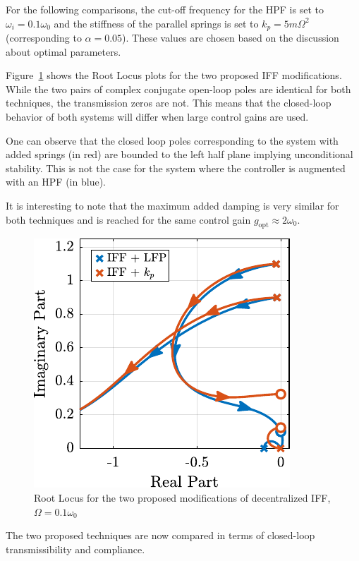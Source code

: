 \documentclass[10pt]{iopart}
\begin{document}
For the following comparisons, the cut-off frequency for the HPF is set to \(\omega_i = 0.1 \omega_0\) and the stiffness of the parallel springs is set to \(k_p = 5 m \Omega^2\) (corresponding to \(\alpha = 0.05\)).
These values are chosen based on the discussion about optimal parameters.

\par
Figure~\ref{fig:comp_root_locus} shows the Root Locus plots for the two proposed IFF modifications.
While the two pairs of complex conjugate open-loop poles are identical for both techniques, the transmission zeros are not.
This means that the closed-loop behavior of both systems will differ when large control gains are used.

One can observe that the closed loop poles corresponding to the system with added springs (in red) are bounded to the left half plane implying unconditional stability.
This is not the case for the system where the controller is augmented with an HPF (in blue).

It is interesting to note that the maximum added damping is very similar for both techniques and is reached for the same control gain \(g_\text{opt} \approx 2 \omega_0\).

\begin{figure}[htbp]
\centering
\includegraphics[scale=1,scale=1]{figs/fig17.pdf}
\caption{\label{fig:comp_root_locus}Root Locus for the two proposed modifications of decentralized IFF, \(\Omega = 0.1 \omega_0\)}
\end{figure}

\par
The two proposed techniques are now compared in terms of closed-loop transmissibility and compliance.
\end{document}
